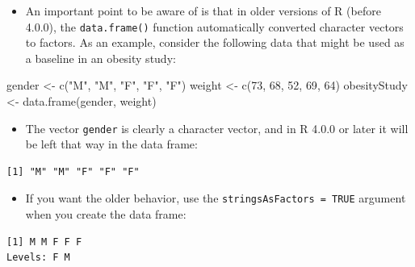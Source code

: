\documentclass[
  9pt,
  a4paper,
  ignorenonframetext,
  notheorems]{beamer}
\newenvironment{Shaded}{\begin{snugshade}}{\end{snugshade}}
\newcommand{\AttributeTok}[1]{\textcolor[rgb]{0.40,0.45,0.13}{#1}}
\newcommand{\ConstantTok}[1]{\textcolor[rgb]{0.56,0.35,0.01}{#1}}
\newcommand{\DecValTok}[1]{\textcolor[rgb]{0.68,0.00,0.00}{#1}}
\newcommand{\FunctionTok}[1]{\textcolor[rgb]{0.28,0.35,0.67}{#1}}
\newcommand{\NormalTok}[1]{\textcolor[rgb]{0.00,0.23,0.31}{#1}}
\newcommand{\OtherTok}[1]{\textcolor[rgb]{0.00,0.23,0.31}{#1}}
\newcommand{\SpecialCharTok}[1]{\textcolor[rgb]{0.37,0.37,0.37}{#1}}
\newcommand{\StringTok}[1]{\textcolor[rgb]{0.13,0.47,0.30}{#1}}
\providecommand{\tightlist}{%
  \setlength{\itemsep}{0pt}\setlength{\parskip}{0pt}}\usepackage{longtable,booktabs,array}
\begin{document}
\begin{frame}[fragile]
\begin{itemize}
\tightlist
\item
  An important point to be aware of is that in older versions of R
  (before 4.0.0), the \texttt{data.frame()} function automatically
  converted character vectors to factors. As an example, consider the
  following data that might be used as a baseline in an obesity study:
\end{itemize}

\begin{Shaded}
\begin{Highlighting}[]
\NormalTok{gender }\OtherTok{\textless{}{-}} \FunctionTok{c}\NormalTok{(}\StringTok{"M"}\NormalTok{, }\StringTok{"M"}\NormalTok{, }\StringTok{"F"}\NormalTok{, }\StringTok{"F"}\NormalTok{, }\StringTok{"F"}\NormalTok{) }
\NormalTok{weight }\OtherTok{\textless{}{-}} \FunctionTok{c}\NormalTok{(}\DecValTok{73}\NormalTok{, }\DecValTok{68}\NormalTok{, }\DecValTok{52}\NormalTok{, }\DecValTok{69}\NormalTok{, }\DecValTok{64}\NormalTok{) }
\NormalTok{obesityStudy }\OtherTok{\textless{}{-}} \FunctionTok{data.frame}\NormalTok{(gender, weight)}
\end{Highlighting}
\end{Shaded}

\begin{itemize}
\tightlist
\item
  The vector \texttt{gender} is clearly a character vector, and in R
  4.0.0 or later it will be left that way in the data frame:
\end{itemize}

\begin{Shaded}
\end{Shaded}

\begin{verbatim}
[1] "M" "M" "F" "F" "F"
\end{verbatim}

\begin{itemize}
\tightlist
\item
  If you want the older behavior, use the
  \texttt{stringsAsFactors\ =\ TRUE} argument when you create the data
  frame:
\end{itemize}

\begin{Shaded}
\end{Shaded}

\begin{verbatim}
[1] M M F F F
Levels: F M
\end{verbatim}
\end{frame}
\end{document}
